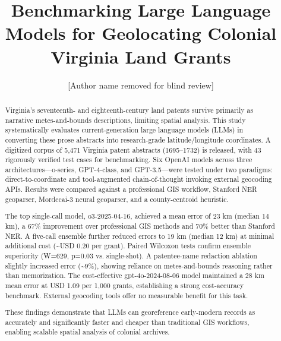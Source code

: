 \documentclass{josis}
\begin{document}
\title{Benchmarking Large Language Models for Geolocating Colonial Virginia Land Grants}
\author{[Author name removed for blind review]}

\maketitle


\begin{abstract}
Virginia's seventeenth- and eighteenth-century land patents survive primarily as narrative metes-and-bounds descriptions, limiting spatial analysis. This study systematically evaluates current-generation large language models (LLMs) in converting these prose abstracts into research-grade latitude/longitude coordinates. A digitized corpus of 5,471 Virginia patent abstracts (1695–1732) is released, with 43 rigorously verified test cases for benchmarking. Six OpenAI models across three architectures—o-series, GPT-4-class, and GPT-3.5—were tested under two paradigms: direct-to-coordinate and tool-augmented chain-of-thought invoking external geocoding APIs. Results were compared against a professional GIS workflow, Stanford NER geoparser, Mordecai-3 neural geoparser, and a county-centroid heuristic.
  
  The top single-call model, o3-2025-04-16, achieved a mean error of 23 km (median 14 km), a 67\% improvement over professional GIS methods and 70\% better than Stanford NER. A five-call ensemble further reduced errors to 19 km (median 12 km) at minimal additional cost (\textasciitilde USD 0.20 per grant). Paired Wilcoxon tests confirm ensemble superiority (W=629, p=0.03 vs. single-shot). A patentee-name redaction ablation slightly increased error (\textasciitilde 9\%), showing reliance on metes-and-bounds reasoning rather than memorization. The cost-effective gpt-4o-2024-08-06 model maintained a 28 km mean error at USD 1.09 per 1,000 grants, establishing a strong cost-accuracy benchmark. External geocoding tools offer no measurable benefit for this task.
  
  These findings demonstrate that LLMs can georeference early-modern records as accurately and significantly faster and cheaper than traditional GIS workflows, enabling scalable spatial analysis of colonial archives.
  \end{abstract}





\end{document}
